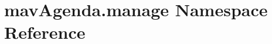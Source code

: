 \hypertarget{namespacemavAgenda_1_1manage}{}\section{mav\+Agenda.\+manage Namespace Reference}
\label{namespacemavAgenda_1_1manage}
